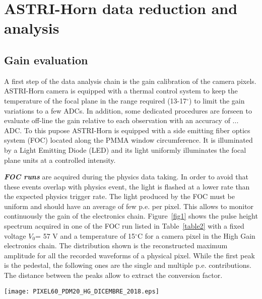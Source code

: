 \section{ASTRI-Horn data reduction and analysis} 
\label{sect:astridata}

\subsection{Gain evaluation}
\label{subs:gain}

A first step of the data analysis chain is the gain calibration of the camera pixels.
ASTRI-Horn camera is equipped with a thermal control system to keep the temperature of the focal plane in the  range required (13-17$^\circ$) to limit the gain variations to a few ADCs. In addition, some dedicated procedures are forseen to evaluate off-line the gain relative to each observation with an accuracy of ... ADC. 
To this pupose ASTRI-Horn is equipped with a side emitting fiber optics system (FOC) located along the PMMA window circumference. It is illuminated by a Light Emitting Diode (LED) and its light uniformly illuminates the focal plane units at a controlled intensity. 


\textbf{\textit{FOC runs}} are acquired during the physics data taking.
In order to avoid that these events overlap with physics event, the light is flashed 
at a lower rate than the expected physics trigger rate. The light 
produced by the FOC must be uniform and should have an average of 
few p.e. per pixel. This allows to monitor continuously the gain of the 
electronics chain. Figure~\ref{fig1} shows the pulse height spectrum acquired in one of the FOC run listed in Table~\ref{table2} with a fixed voltage $V_{0}$= 57 V 
and a temperature of 15$^\circ$C for a camera pixel in the High Gain electronics chain. 
The distribution shown is the reconstructed maximum amplitude for all the 
recorded waveforms of a physical pixel. While the first peak is the pedestal, the following 
ones are the single and multiple p.e. contributions. The distance between 
the peaks allow to extract the conversion factor.\\
\begin{figure*}[ht!!]
\centering
\texttt{[image: PIXEL60\_PDM20\_HG\_DICEMBRE\_2018.eps]}
\vspace{0.5cm}
\caption{ Pulse height spectrum at a fixed temperature of 15$^\circ$C
and $V_{0}$=57 V for a camera pixel, during a FOC run in the HG electronics chain. 
The black curve represents the distribution of the peak detector output and the red curve shows the corresponding
multiple peaks Gaussian fit.}
\label{fig1}
\end{figure*}

